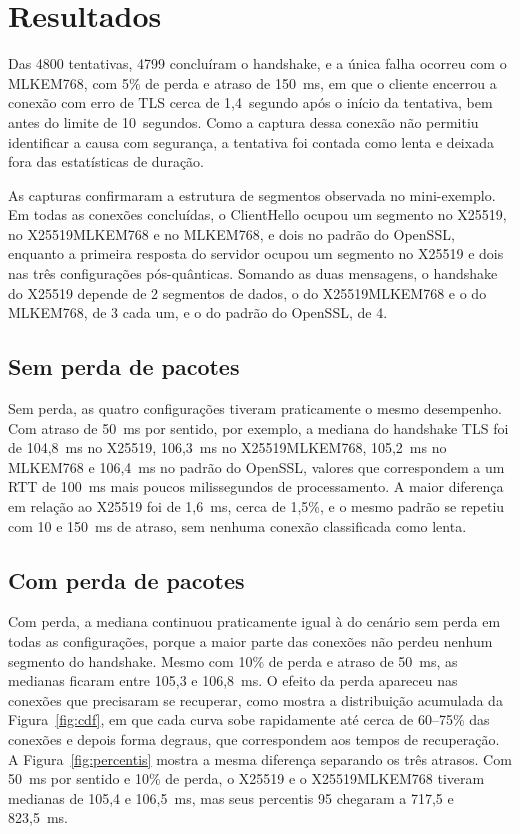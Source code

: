 \documentclass[12pt,a4paper]{article}
\begin{document}
\section{Resultados}
\label{sec:resultados}

Das 4800 tentativas, 4799 concluíram o handshake, e a única falha ocorreu
com o MLKEM768, com 5\% de perda e atraso de 150~ms, em que o cliente encerrou a conexão com erro de TLS cerca de
1,4~segundo após o início da tentativa, bem antes do limite de 10~segundos.
Como a captura dessa conexão não permitiu identificar a causa com segurança,
a tentativa foi contada como lenta e deixada fora das estatísticas de
duração.

As capturas confirmaram a estrutura de segmentos observada no mini-exemplo.
Em todas as conexões concluídas, o ClientHello ocupou um segmento no
X25519, no X25519MLKEM768 e no MLKEM768, e dois no padrão do OpenSSL,
enquanto a primeira resposta do servidor ocupou um segmento no X25519 e
dois nas três configurações pós-quânticas. Somando as duas mensagens, o handshake do X25519 depende de 2 segmentos de
dados, o do X25519MLKEM768 e o do MLKEM768, de 3 cada um, e o do padrão do
OpenSSL, de 4.

\subsection{Sem perda de pacotes}

Sem perda, as quatro configurações tiveram praticamente o mesmo desempenho.
Com atraso de 50~ms por sentido, por exemplo, a mediana do handshake TLS foi
de 104,8~ms no X25519, 106,3~ms no X25519MLKEM768, 105,2~ms no MLKEM768 e
106,4~ms no padrão do OpenSSL, valores que correspondem a um RTT de 100~ms mais
poucos milissegundos de processamento. A maior diferença em relação ao
X25519 foi de 1,6~ms, cerca de 1,5\%, e o mesmo padrão se repetiu com 10 e 150~ms de atraso, sem nenhuma conexão
classificada como lenta.

\subsection{Com perda de pacotes}

Com perda, a mediana continuou praticamente igual à do cenário sem perda
em todas as configurações, porque a maior parte das conexões não perdeu
nenhum segmento do handshake. Mesmo com 10\% de perda e atraso de 50~ms, as
medianas ficaram entre 105,3 e 106,8~ms. O efeito da perda apareceu nas
conexões que precisaram se recuperar, como mostra a distribuição acumulada
da Figura~\ref{fig:cdf}, em que cada curva sobe rapidamente até cerca de
60--75\% das conexões e depois forma degraus, que correspondem aos tempos
de recuperação. A Figura~\ref{fig:percentis} mostra a mesma diferença
separando os três atrasos. Com 50~ms por sentido e 10\% de perda, o X25519
e o X25519MLKEM768 tiveram medianas de 105,4 e 106,5~ms, mas seus
percentis 95 chegaram a 717,5 e 823,5~ms.
\end{document}
